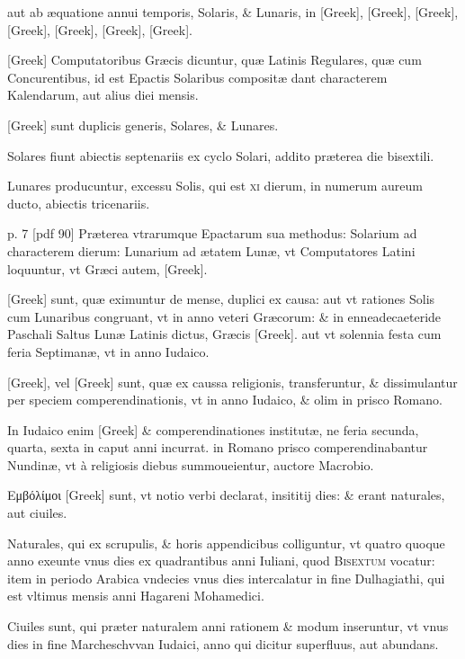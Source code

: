 \begin{parnumbers}
aut ab æquatione annui
temporis, Solaris, \& Lunaris, in \textgreek{[Greek]}, \textgreek{[Greek]},
\textgreek{[Greek]}, \textgreek{[Greek]}, \textgreek{[Greek]},
\textgreek{[Greek]}, \textgreek{[Greek]}.

\textgreek{[Greek]} Computatoribus
Græcis dicuntur, quæ Latinis Regulares, quæ cum  Concurentibus,
id est Epactis Solaribus compositæ dant characterem Kalendarum,
aut alius diei mensis.

\textgreek{[Greek]} sunt duplicis generis, Solares, \&
Lunares.

Solares fiunt abiectis septenariis ex cyclo Solari, addito præterea
die bisextili.

Lunares producuntur, excessu Solis, qui est \textsc{xi} dierum,
in numerum aureum ducto, abiectis tricenariis.

\clearpage
p. 7 [pdf 90]
Præterea vtrarumque
Epactarum sua methodus: Solarium ad characterem dierum:
Lunarium ad ætatem Lunæ, vt Computatores Latini loquuntur, vt
Græci autem, \textgreek{[Greek]}.

\textgreek{[Greek]} sunt, quæ eximuntur de
mense, duplici ex causa: aut vt rationes Solis cum Lunaribus congruant,
vt in anno veteri Græcorum: \& in enneadecaeteride Paschali
Saltus Lunæ Latinis dictus, Græcis \textgreek{[Greek]}. aut vt solennia
festa cum feria Septimanæ, vt in anno Iudaico.

\textgreek{[Greek]}, vel \textgreek{[Greek]}
sunt, quæ ex caussa religionis, transferuntur, \& dissimulantur per speciem
comperendinationis, vt in anno Iudaico, \& olim in prisco Romano.

In Iudaico enim \textgreek{[Greek]} \& comperendinationes institutæ, ne
feria secunda, quarta, sexta in caput anni incurrat. in Romano prisco
comperendinabantur Nundinæ, vt à religiosis diebus summoueientur,
auctore Macrobio.

\textgreek{Εμβόλίμοι [Greek]} sunt, vt notio verbi declarat, insititij
dies: \& erant naturales, aut ciuiles.

Naturales, qui ex scrupulis, \&
horis appendicibus colliguntur, vt quatro quoque anno exeunte vnus
dies ex quadrantibus anni Iuliani, quod \textsc{Bisextum} vocatur: item
in periodo Arabica vndecies vnus dies intercalatur in fine Dulhagiathi,
qui est vltimus mensis anni Hagareni Mohamedici.

Ciuiles sunt,
qui præter naturalem anni rationem \& modum inseruntur, vt vnus
dies in fine Marcheschvvan Iudaici, anno qui dicitur superfluus, aut
abundans.


\end{parnumbers}
